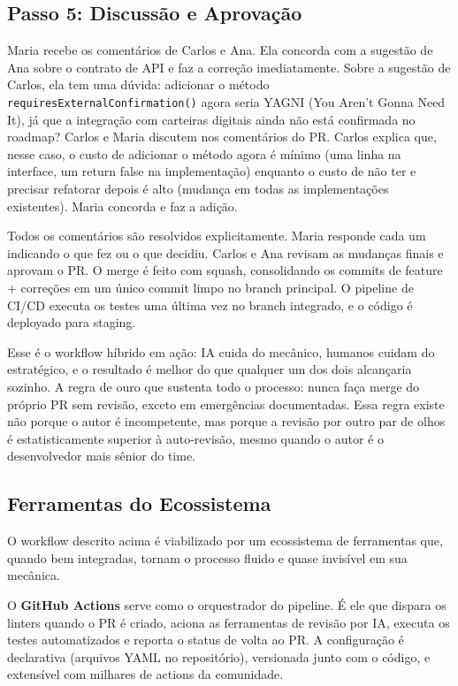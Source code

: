 \subsection{Passo 5: Discussão e Aprovação}

Maria recebe os comentários de Carlos e Ana. Ela concorda com a sugestão de Ana sobre
o contrato de API e faz a correção imediatamente. Sobre a sugestão de Carlos, ela tem
uma dúvida: adicionar o método \texttt{requiresExternalConfirmation()} agora seria
YAGNI (You Aren't Gonna Need It), já que a integração com carteiras digitais ainda
não está confirmada no roadmap? Carlos e Maria discutem nos comentários do PR. Carlos
explica que, nesse caso, o custo de adicionar o método agora é mínimo (uma linha na
interface, um return false na implementação) enquanto o custo de não ter e precisar
refatorar depois é alto (mudança em todas as implementações existentes). Maria
concorda e faz a adição.

Todos os comentários são resolvidos explicitamente. Maria responde cada um indicando
o que fez ou o que decidiu. Carlos e Ana revisam as mudanças finais e aprovam o PR.
O merge é feito com squash, consolidando os commits de feature + correções em um
único commit limpo no branch principal. O pipeline de CI/CD executa os testes uma
última vez no branch integrado, e o código é deployado para staging.

Esse é o workflow híbrido em ação: IA cuida do mecânico, humanos cuidam do
estratégico, e o resultado é melhor do que qualquer um dos dois alcançaria sozinho.
A regra de ouro que sustenta todo o processo: nunca faça merge do próprio PR sem
revisão, exceto em emergências documentadas. Essa regra existe não porque o autor
é incompetente, mas porque a revisão por outro par de olhos é estatisticamente
superior à auto-revisão, mesmo quando o autor é o desenvolvedor mais sênior do
time.

\subsection{Ferramentas do Ecossistema}

O workflow descrito acima é viabilizado por um ecossistema de ferramentas que, quando
bem integradas, tornam o processo fluido e quase invisível em sua mecânica.

O \textbf{GitHub Actions} serve como o orquestrador do pipeline. É ele que dispara os
linters quando o PR é criado, aciona as ferramentas de revisão por IA, executa os
testes automatizados e reporta o status de volta ao PR. A configuração é declarativa
(arquivos YAML no repositório), versionada junto com o código, e extensível com
milhares de actions da comunidade.

